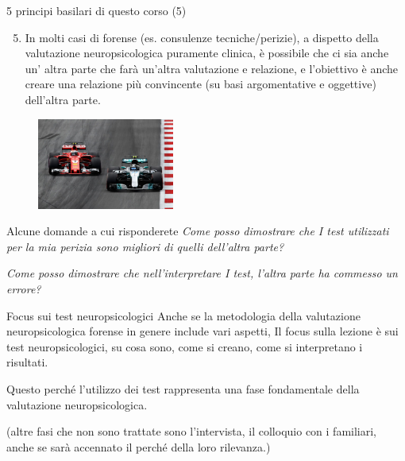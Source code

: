 \documentclass[
  ignorenonframetext,
]{beamer}
\providecommand{\tightlist}{%
  \setlength{\itemsep}{0pt}\setlength{\parskip}{0pt}}
\begin{document}
\begin{frame}{5 principi basilari di questo corso (5)}
\label{principi-basilari-di-questo-corso-5}
\begin{enumerate}
\setcounter{enumi}{4}
\tightlist
\item
  In molti casi di forense (es. consulenze tecniche/perizie), a dispetto
  della valutazione neuropsicologica puramente clinica, è possibile che
  ci sia anche un' altra parte che farà un'altra valutazione e
  relazione, e l'obiettivo è anche creare una relazione più convincente
  (su basi argomentative e oggettive) dell'altra parte. \vspace{2em}
\end{enumerate}

\begin{figure}
\includegraphics[width=0.4\textwidth]{Figures/F1_2.jpg}
\end{figure}
\end{frame}

\begin{frame}{Alcune domande a cui risponderete}
\label{alcune-domande-a-cui-risponderete}
\emph{Come posso dimostrare che I test utilizzati per la mia perizia
sono migliori di quelli dell'altra parte?}

\emph{Come posso dimostrare che nell'interpretare I test, l'altra parte
ha commesso un errore?}
\end{frame}

\begin{frame}{Focus sui test neuropsicologici}
\label{focus-sui-test-neuropsicologici}
Anche se la metodologia della valutazione neuropsicologica forense in
genere include vari aspetti, Il focus sulla lezione è sui test
neuropsicologici, su cosa sono, come si creano, come si interpretano i
risultati.

Questo perché l'utilizzo dei test rappresenta una fase fondamentale
della valutazione neuropsicologica.

\pause

(altre fasi che non sono trattate sono l'intervista, il colloquio con i
familiari, anche se sarà accennato il perché della loro rilevanza.)
\end{frame}
\end{document}
